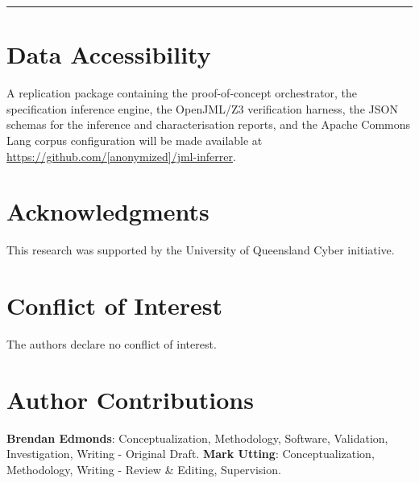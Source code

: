 \documentclass[11pt]{article}
\begin{document}
\vspace{1em}
\hrule
\vspace{1em}
















\section*{Data Accessibility}

A replication package containing the proof-of-concept orchestrator, the
specification inference engine, the OpenJML/Z3 verification harness, the
JSON schemas for the inference and characterisation reports, and the
Apache Commons Lang corpus configuration will be made available at
\url{https://github.com/[anonymized]/jml-inferrer}.

\section*{Acknowledgments}

This research was supported by the University of Queensland Cyber initiative.

\section*{Conflict of Interest}

The authors declare no conflict of interest.

\section*{Author Contributions}

\textbf{Brendan Edmonds}: Conceptualization, Methodology, Software, Validation, Investigation, Writing - Original Draft. \textbf{Mark Utting}: Conceptualization, Methodology, Writing - Review \& Editing, Supervision.



\end{document}
